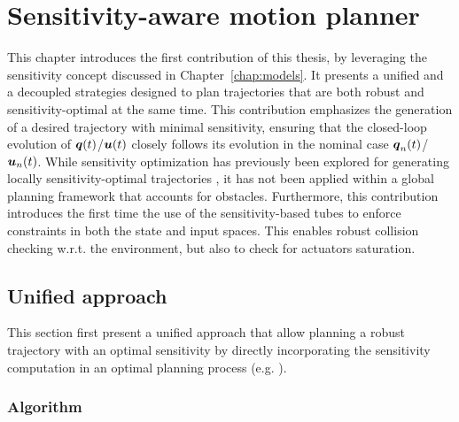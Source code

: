 \chapter{Sensitivity-aware motion planner}

This chapter introduces the first contribution of this thesis, by leveraging the sensitivity concept discussed in Chapter~\ref{chap:models}.
It presents a unified and a decoupled strategies designed to plan trajectories that are both robust and sensitivity-optimal at the same time.
This contribution emphasizes the generation of a desired trajectory with minimal sensitivity, ensuring that the closed-loop evolution of $\boldsymbol{q}(t)$/$\boldsymbol{u}(t)$ closely follows its evolution in the nominal case $\boldsymbol{q}_n(t)$/$\boldsymbol{u}_n(t)$.
While sensitivity optimization has previously been explored for generating locally sensitivity-optimal trajectories \cite{cPi, cTh}, it has not been applied within a global planning framework that accounts for obstacles.
Furthermore, this contribution introduces the first time the use of the sensitivity-based tubes to enforce constraints in both the state and input spaces.
This enables robust collision checking w.r.t. the environment, but also to check for actuators saturation.



\section{Unified approach}

This section first present a unified approach that allow planning a robust trajectory with an optimal sensitivity by directly incorporating the sensitivity computation in an optimal planning process (e.g. ).

\subsection{Algorithm}
